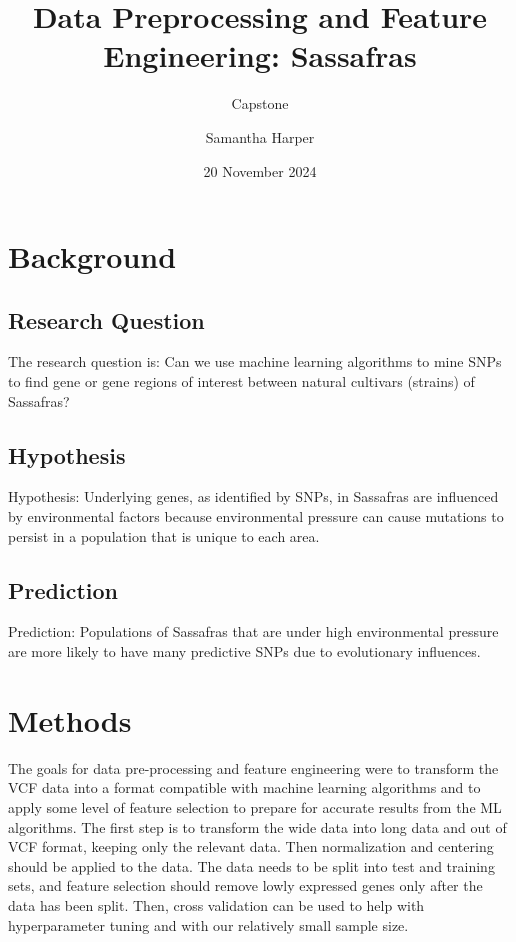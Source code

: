 \documentclass[
]{article}
\title{Data Preprocessing and Feature Engineering: Sassafras}
\subtitle{Capstone}
\author{Samantha Harper}
\date{20 November 2024}
\begin{document}
\maketitle

{
\setcounter{tocdepth}{2}
\tableofcontents
}
\section{Background}\label{background}

\subsection{Research Question}\label{research-question}

The research question is: Can we use machine learning algorithms to mine
SNPs to find gene or gene regions of interest between natural cultivars
(strains) of Sassafras?

\subsection{Hypothesis}\label{hypothesis}

Hypothesis: Underlying genes, as identified by SNPs, in Sassafras are
influenced by environmental factors because environmental pressure can
cause mutations to persist in a population that is unique to each area.

\subsection{Prediction}\label{prediction}

Prediction: Populations of Sassafras that are under high environmental
pressure are more likely to have many predictive SNPs due to
evolutionary influences.

\section{Methods}\label{methods}

The goals for data pre-processing and feature engineering were to
transform the VCF data into a format compatible with machine learning
algorithms and to apply some level of feature selection to prepare for
accurate results from the ML algorithms. The first step is to transform
the wide data into long data and out of VCF format, keeping only the
relevant data. Then normalization and centering should be applied to the
data. The data needs to be split into test and training sets, and
feature selection should remove lowly expressed genes only after the
data has been split. Then, cross validation can be used to help with
hyperparameter tuning and with our relatively small sample size.
\end{document}

